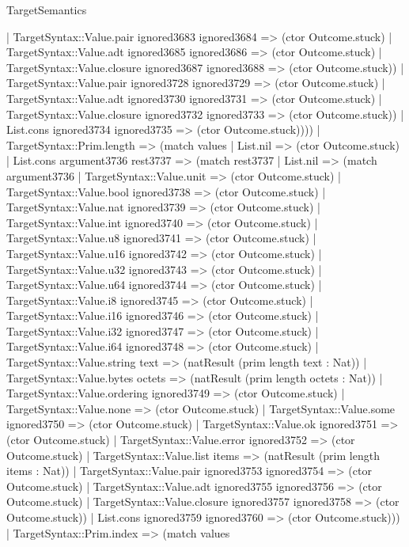 \begin{lexlean}{TargetSemantics}
\begin{semanticmodule}
{              | TargetSyntax::Value.pair ignored3683 ignored3684 => (ctor Outcome.stuck)
              | TargetSyntax::Value.adt ignored3685 ignored3686 => (ctor Outcome.stuck)
              | TargetSyntax::Value.closure ignored3687 ignored3688 => (ctor Outcome.stuck))
            | TargetSyntax::Value.pair ignored3728 ignored3729 => (ctor Outcome.stuck)
            | TargetSyntax::Value.adt ignored3730 ignored3731 => (ctor Outcome.stuck)
            | TargetSyntax::Value.closure ignored3732 ignored3733 => (ctor Outcome.stuck))
          | List.cons ignored3734 ignored3735 => (ctor Outcome.stuck))))
    | TargetSyntax::Prim.length => (match values
      | List.nil => (ctor Outcome.stuck)
      | List.cons argument3736 rest3737 => (match rest3737
        | List.nil => (match argument3736
          | TargetSyntax::Value.unit => (ctor Outcome.stuck)
          | TargetSyntax::Value.bool ignored3738 => (ctor Outcome.stuck)
          | TargetSyntax::Value.nat ignored3739 => (ctor Outcome.stuck)
          | TargetSyntax::Value.int ignored3740 => (ctor Outcome.stuck)
          | TargetSyntax::Value.u8 ignored3741 => (ctor Outcome.stuck)
          | TargetSyntax::Value.u16 ignored3742 => (ctor Outcome.stuck)
          | TargetSyntax::Value.u32 ignored3743 => (ctor Outcome.stuck)
          | TargetSyntax::Value.u64 ignored3744 => (ctor Outcome.stuck)
          | TargetSyntax::Value.i8 ignored3745 => (ctor Outcome.stuck)
          | TargetSyntax::Value.i16 ignored3746 => (ctor Outcome.stuck)
          | TargetSyntax::Value.i32 ignored3747 => (ctor Outcome.stuck)
          | TargetSyntax::Value.i64 ignored3748 => (ctor Outcome.stuck)
          | TargetSyntax::Value.string text => (natResult (prim length text : Nat))
          | TargetSyntax::Value.bytes octets => (natResult (prim length octets : Nat))
          | TargetSyntax::Value.ordering ignored3749 => (ctor Outcome.stuck)
          | TargetSyntax::Value.none => (ctor Outcome.stuck)
          | TargetSyntax::Value.some ignored3750 => (ctor Outcome.stuck)
          | TargetSyntax::Value.ok ignored3751 => (ctor Outcome.stuck)
          | TargetSyntax::Value.error ignored3752 => (ctor Outcome.stuck)
          | TargetSyntax::Value.list items => (natResult (prim length items : Nat))
          | TargetSyntax::Value.pair ignored3753 ignored3754 => (ctor Outcome.stuck)
          | TargetSyntax::Value.adt ignored3755 ignored3756 => (ctor Outcome.stuck)
          | TargetSyntax::Value.closure ignored3757 ignored3758 => (ctor Outcome.stuck))
        | List.cons ignored3759 ignored3760 => (ctor Outcome.stuck)))
    | TargetSyntax::Prim.index => (match values
}
\end{semanticmodule}
\end{lexlean}

